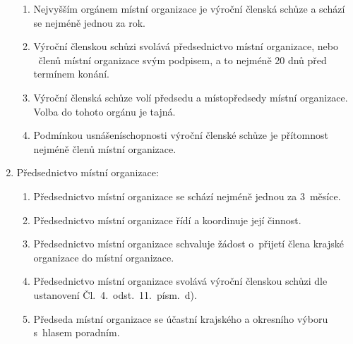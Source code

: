 \documentclass[a4paper]{article}
\begin{document}
\begin{enumerate}
\begin{enumerate}
        \item Nejvyšším orgánem místní organizace je výroční členská schůze a
            schází se nejméně jednou za rok.

        \item Výroční členskou schůzi svolává předsednictvo místní organizace,
            nebo ~členů místní organizace svým podpisem, a to
            nejméně 20 dnů před termínem konání.

        \item Výroční členská schůze volí předsedu a místopředsedy místní
            organizace.
            Volba do tohoto orgánu je tajná.

        \item Podmínkou usnášeníschopnosti výroční členské schůze
            je přítomnost nejméně  členů místní organizace.
        \end{enumerate}


    \item Předsednictvo místní organizace:
        \begin{enumerate}
        \item Předsednictvo místní organizace se schází nejméně jednou za
            3~měsíce.

        \item Předsednictvo místní organizace řídí a koordinuje její činnost.

        \item Předsednictvo místní organizace schvaluje žádost o~přijetí
            člena krajské organizace do místní organizace.

        \item Předsednictvo místní organizace svolává výroční členskou
            schůzi dle ustanovení Čl.~4.~odst.~11.~písm.~d).

        \item Předseda místní organizace se účastní krajského a okresního výboru
            s~hlasem poradním.
        \end{enumerate}
    \end{enumerate}
\end{document}
